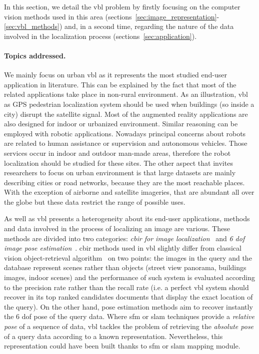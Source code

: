 \label{sec:introduction}
	
	In this section, we detail the \ac{vbl} problem by firstly focusing on the computer vision methods used in this area (sections~\ref{sec:image_representation}-\ref{sec:vbl_methods}) and, in a second time, regarding the nature of the data involved in the localization process (sections~\ref{sec:application}).
	
	\paragraph{Topics addressed.}
		We mainly focus on urban \ac{vbl} as it represents the most studied end-user application in literature. This can be explained by the fact that most of the related applications take place in non-rural environment. As an illustration, \ac{vbl} as GPS pedestrian localization system should be used when buildings (so inside a city) disrupt the satellite signal. Most of the augmented reality applications are also designed for indoor or urbanized environment. Similar reasoning can be employed with robotic applications. Nowadays principal concerns about robots are related to human assistance or supervision and autonomous vehicles. Those services occur in indoor and outdoor man-made areas, therefore the robot localization should be studied for these sites. The other aspect that invites researchers to focus on urban environment is that large datasets are mainly describing cities or road networks, because they are the most reachable places. With the exception of airborne and satellite imageries, that are abundant all over the globe but these data restrict the range of possible uses.
				
		As well as \ac{vbl} presents a heterogeneity about its end-user applications, methods and data involved in the process of localizing an image are various. These methods are divided into two categories: \textit{\ac{cbir} for image localization}~\citep{Arandjelovic2012,Radenovic2016,Liu2018} and \textit{6 \ac{dof} image pose estimation}~\citep{Sattler2016a, Brachmann2017b,Sarlin2018a}. \ac{cbir} methods used in \ac{vbl} slightly differ from classical vision object-retrieval algorithm~\citep{Sivic2003} on two points: the images in the query and the database represent scenes rather than objects (\eg street view panorama, buildings images, indoor scenes) and the performance of such system is evaluated according to the precision rate rather than the recall rate (i.e. a perfect \ac{vbl} system should recover in its top ranked candidates documents that display the exact location of the query). On the other hand, pose estimation methods aim to recover instantly the 6 \ac{dof} pose of the query data. Where \ac{sfm} or \ac{slam} techniques provide a \textit{relative pose} of a sequence of data, \ac{vbl} tackles the problem of retrieving the \textit{absolute pose} of a query data according to a known representation. Nevertheless, this representation could have been built thanks to \ac{sfm} or \ac{slam} mapping module.
			

